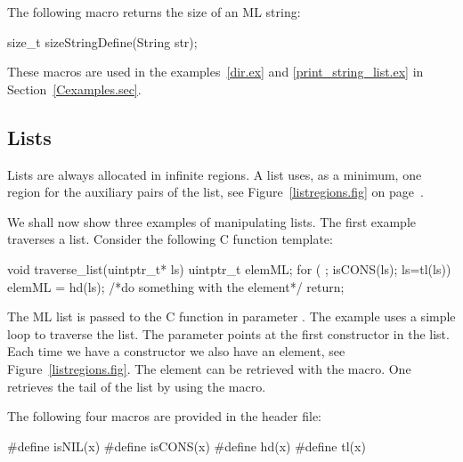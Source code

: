 \documentclass[12pt]{book}
\begin{document}
The following macro returns the size of an ML string:
%
%
%
\begin{scriptcode}
  size_t sizeStringDefine(String str);
\end{scriptcode}

These macros are used in the examples~\ref{dir.ex} and
\ref{print_string_list.ex} in Section~\ref{Cexamples.sec}.

\subsection{Lists}

Lists are always allocated in infinite regions. A list uses, as a minimum, one
region for the auxiliary pairs of the list, see Figure~\ref{listregions.fig} on
page~\pageref{listregions.fig}.

We shall now show three examples of manipulating lists. The first example
traverses a list. Consider the following C function template:
%
%
%
\begin{scriptcode}
  void traverse_list(uintptr_t* ls) {
    uintptr_t elemML;
    for ( ; isCONS(ls); ls=tl(ls)) {
      elemML = hd(ls);
      /*do something with the element*/
    }
    return;
  }
\end{scriptcode}

The ML list is passed to the C function in parameter .  The example uses
a simple loop to traverse the list. The parameter  points at the first
constructor in the list. Each time we have a  constructor we also have
an element, see Figure~\ref{listregions.fig}. The element can be retrieved with
the  macro.  One retrieves the tail of the list by using the 
macro.

The following four macros are provided in the  header
file:
%
%
%
%
%
%
\begin{scriptcode}
  #define isNIL(x)
  #define isCONS(x)
  #define hd(x)
  #define tl(x)
\end{scriptcode}
\end{document}
